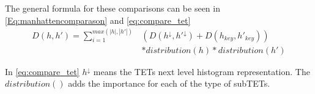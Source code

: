 	The general formula for these comparisons can be seen in \autoref{Eq:manhattencomparason} and \autoref{eq:compare_tet}
	\begin{equation}\label{eq:compare_tet}
	\begin{split}
	D(h,h') = \sum_{i=1}^{max(|h|,|h'|)} & (D(h^{\downarrow}, h'^{\downarrow})+ D(h_{key}, h'_{key}))  \\
	& * distribution(h) * distribution (h')
	\end{split}
	\end{equation}
	
	In \autoref{eq:compare_tet} $h^{\downarrow}$ means the TETs next level histogram representation. The $distribution()$ adds the importance for each of the type of subTETs.
